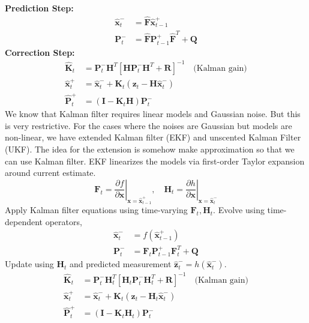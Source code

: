 \documentclass{article}
\renewcommand{\v}[1]{ \ensuremath{ {\mathbf{#1}} }}
\begin{document}
\textbf{Prediction Step:}
\begin{align}
\hat{\v{x}}_t^- &= \v{\hat F} \hat{\v{x}}_{t-1}^+ \\
\v{P}_t^- &= \v{\hat F} \v{P}_{t-1}^+ \v{\hat F}^T + \v{Q}
\end{align}
\textbf{Correction Step:}
\begin{align}
\v{\hat K}_t &= \v{P}_t^- \v{H}^T \left[\v{H} \v{P}_t^- \v{H}^T + \v{R}\right]^{-1} \quad \text{(Kalman gain)} \\
\hat{\v{x}}_t^+ &= \hat{\v{x}}_t^- + \v{K}_t (\v{z}_t - \v{H}\hat{\v{x}}_t^-) \\
\v{\hat P}_t^+ &= (\v{I} - \v{K}_t \v{H}) \v{P}_t^-
\end{align}
We know that Kalman filter requires linear models and Gaussian noise. But this is very restrictive. For the cases where the noises are Gaussian but models are non-linear, we have extended Kalman filter (EKF) and unscented Kalman Filter (UKF). The idea for the extension is somehow make approximation so that we can use Kalman filter. EKF linearizes the models via first-order Taylor expansion around current estimate.
\begin{equation}
\v{F}_t = \left.\frac{\partial f}{\partial \v{x}}\right|_{\v{x} = \hat{\v{x}}_{t-1}^+}, \quad
\v{H}_t = \left.\frac{\partial h}{\partial \v{x}}\right|_{\v{x} = \hat{\v{x}}_t^-}
\end{equation}
Apply Kalman filter equations using time-varying $\v{F}_t, \v{H}_t$. Evolve using time-dependent operators,
\begin{align}
\hat{\v{x}}_t^- &= f(\hat{\v{x}}_{t-1}^+) \\
\v{P}_t^- &= \v{F}_t \v{P}_{t-1}^+ \v{F}_t^T + \v{Q}
\end{align}
Update using  $\v{H}_t$ and predicted measurement $\hat{\v{z}}_t^- = h(\hat{\v{x}}_t^-)$.
\begin{align}
\v{\hat K}_t &= \v{P}_t^- \v{H}_t^T \left[\v{H}_t \v{P}_t^- \v{H}_t^T + \v{R}\right]^{-1} \quad \text{(Kalman gain)} \\
\hat{\v{x}}_t^+ &= \hat{\v{x}}_t^- + \v{K}_t (\v{z}_t - \v{H}_t\hat{\v{x}}_t^-) \\
\v{\hat P}_t^+ &= (\v{I} - \v{K}_t \v{H}_t) \v{P}_t^-
\end{align}
\end{document}
